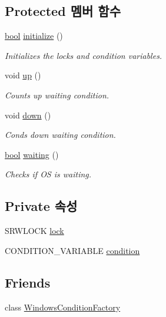 \subsection*{Protected 멤버 함수}
\begin{DoxyCompactItemize}
\item 
\hyperlink{avb__gptp_8h_af6a258d8f3ee5206d682d799316314b1}{bool} \hyperlink{class_windows_condition_ab3e7cc706c522b3231f9156bba461436}{initialize} ()
\begin{DoxyCompactList}\small\item\em Initializes the locks and condition variables. \end{DoxyCompactList}\item 
void \hyperlink{class_o_s_condition_a0a1d932d49dd1079cfd0964b11adc7a0}{up} ()
\begin{DoxyCompactList}\small\item\em Counts up waiting condition. \end{DoxyCompactList}\item 
void \hyperlink{class_o_s_condition_a6663cf1e20c2f8162d29d31c8f6324e6}{down} ()
\begin{DoxyCompactList}\small\item\em Conds down waiting condition. \end{DoxyCompactList}\item 
\hyperlink{avb__gptp_8h_af6a258d8f3ee5206d682d799316314b1}{bool} \hyperlink{class_o_s_condition_a048a0b424dfef3a139f43ad4ae9c1904}{waiting} ()
\begin{DoxyCompactList}\small\item\em Checks if OS is waiting. \end{DoxyCompactList}\end{DoxyCompactItemize}
\subsection*{Private 속성}
\begin{DoxyCompactItemize}
\item 
S\+R\+W\+L\+O\+CK \hyperlink{class_windows_condition_afed18a2dbad108768defb51810a7a760}{lock}
\item 
C\+O\+N\+D\+I\+T\+I\+O\+N\+\_\+\+V\+A\+R\+I\+A\+B\+LE \hyperlink{class_windows_condition_aa20c95b787df750c845ec1e9e085162b}{condition}
\end{DoxyCompactItemize}
\subsection*{Friends}
\begin{DoxyCompactItemize}
\item 
class \hyperlink{class_windows_condition_acc3bd90d296b539e00629c9f923797f3}{Windows\+Condition\+Factory}
\end{DoxyCompactItemize}


